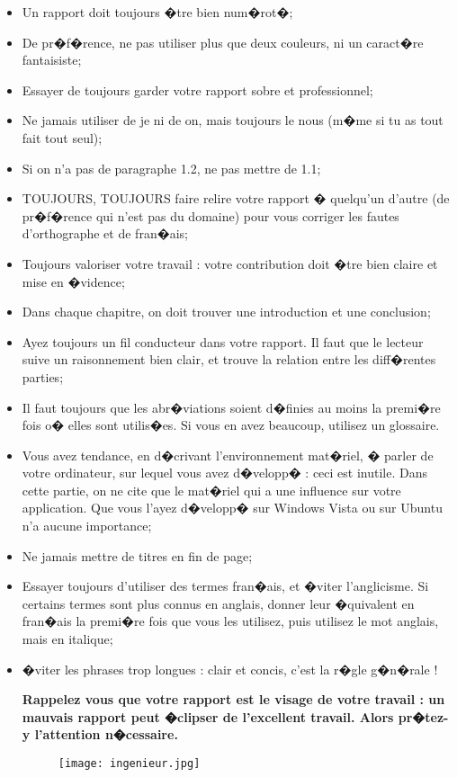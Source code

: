 \begin{itemize}
\item Un rapport doit toujours �tre bien num�rot�;
\item De pr�f�rence, ne pas utiliser plus que deux couleurs, ni un caract�re fantaisiste; 
\item Essayer de toujours garder votre rapport sobre et professionnel; 
\item Ne jamais utiliser de je ni de on, mais toujours le nous (m�me si tu as tout fait tout seul); 
\item Si on n'a pas de paragraphe 1.2, ne pas mettre de 1.1;
\item TOUJOURS, TOUJOURS faire relire votre rapport � quelqu'un d'autre (de pr�f�rence qui n'est pas du domaine) pour vous corriger les fautes d'orthographe et de fran�ais;
\item Toujours valoriser votre travail : votre contribution doit �tre bien claire et mise en �vidence; 
\item Dans chaque chapitre, on doit trouver une introduction et une conclusion;
\item Ayez toujours un fil conducteur dans votre rapport. Il faut que le lecteur suive un raisonnement bien clair, et trouve la relation entre les diff�rentes parties;
\item Il faut toujours que les abr�viations soient d�finies au moins la premi�re fois o� elles sont utilis�es. Si vous en avez beaucoup, utilisez un glossaire.
\item Vous avez tendance, en d�crivant  l'environnement mat�riel, � parler de votre ordinateur, sur lequel vous avez d�velopp� : ceci est inutile. Dans cette partie, on ne cite que le mat�riel qui a une influence sur votre application. Que vous l'ayez d�velopp� sur Windows Vista ou sur Ubuntu n'a aucune importance;
\item Ne jamais mettre de titres en fin de page; 
\item Essayer toujours d'utiliser des termes fran�ais, et �viter l'anglicisme. Si certains termes  sont plus connus en  anglais, donner leur �quivalent en fran�ais la premi�re fois que vous les utilisez, puis utilisez le mot anglais, mais en italique;
\item �viter les phrases trop longues : clair et concis, c'est la r�gle g�n�rale !\\

\newpage

\textbf{Rappelez vous que votre rapport est le visage de votre travail : un mauvais rapport peut �clipser de l'excellent travail. Alors pr�tez-y l'attention n�cessaire.}

 
\begin{figure}[!ht]\centering
\texttt{[image: ingenieur.jpg]}
\end{figure}
\end{itemize}

